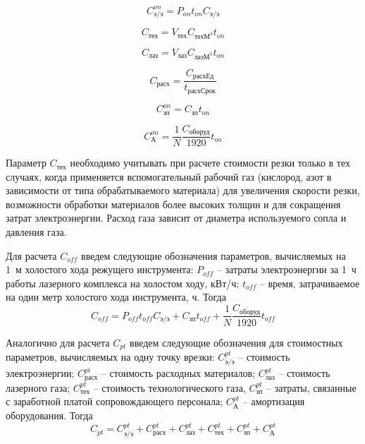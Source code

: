 \documentclass[11pt,twoside,openany]{report}
\begin{document}
\begin{equation}
  C_\text{э/э}^{on} =
  P_{on} t_{on}   C_\text{э/э}
  \label{c-on-ee}
\end{equation}

\begin{equation}
  C_\text{тех} =
  V_\text{тех} C_{\text{техМ}^3} t_{on}
  \label{c-on-teh}
\end{equation}

\begin{equation}
  C_\text{лаз} =
  V_\text{лаз} C_{\text{лазМ}^3} t_{on}
  \label{c-on-laz}
\end{equation}

\begin{equation}
  C_\text{расх} =
  \frac{C_\text{расхЕд}}{t_\text{расхСрок}}
  \label{c-on-rasx}
\end{equation}

\begin{equation}
  C_\text{зп}^{on} =
  C_\text{зп} t_{on}
  \label{c-on-zp}
\end{equation}

\begin{equation}
  C_\text{А}^{on} =
  \frac{1}N \frac{C_\text{оборуд}}{1920} t_{on}
  \label{c-on-A}
\end{equation}

Параметр
$C_\text{тех}$
необходимо учитывать при расчете стоимости резки
только в тех случаях,
когда применяется вспомогательный рабочий газ
(кислород, азот в зависимости от типа обрабатываемого материала)
для увеличения скорости резки,
возможности обработки материалов более высоких толщин
и для сокращения затрат электроэнергии.
Расход газа зависит от диаметра используемого сопла и давления газа.

Для расчета
$C_{off}$
введем следующие обозначения параметров,
вычисляемых на 1~м холостого хода режущего инструмента:
$P_{off}$ -- затраты электроэнергии за 1~ч работы лазерного комплекса на холостом ходу, кВт/ч;
$t_{off}$ -- время, затрачиваемое на один метр холостого хода инструмента, ч.
Тогда
\begin{equation}
  C_{off} =
  P_{off} t_{off} C_\text{э/э}
  + C_\text{зп} t_{off}
  + \frac{1}N \frac{C_\text{оборуд}}{1920} t_{off}
  \label{c-off}
\end{equation}

Аналогично для расчета
$C_{pt}$
введем следующие обозначения для стоимостных параметров,
вычисляемых на одну точку врезки:
$C_\text{э/э}^{pt}$ -- стоимость электроэнергии;
$C_\text{расх}^{pt}$ -- стоимость расходных материалов;
$C_\text{лаз}^{pt}$ -- стоимость лазерного газа;
$C_\text{тех}^{pt}$ -- стоимость технологического газа,
$C_\text{зп}^{pt}$ -- затраты, связанные с заработной платой сопровождающего персонала;
$C_\text{А}^{pt}$ -- амортизация оборудования.
Тогда
\begin{equation}
  C_{pt} =
  C_\text{э/э}^{pt} +
  C_\text{расх}^{pt} +
  C_\text{лаз}^{pt} +
  C_\text{тех}^{pt} +
  C_\text{зп}^{pt} +
  C_\text{А}^{pt}
  \label{c-pt}
\end{equation}
\end{document}
